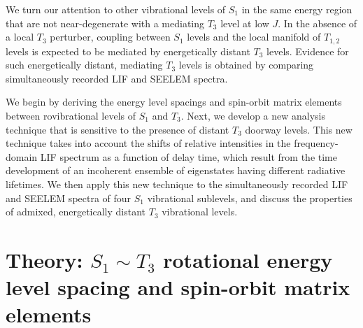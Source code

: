 \documentclass[12pt]{mitthesis}
\begin{document}
We turn our attention to other vibrational levels of $S_1$ in the same
energy region that are not near-degenerate with a mediating $T_3$
level at low $J$.  In the absence of a local $T_3$ perturber, coupling
between $S_1$ levels and the local manifold of $T_{1,2}$ levels is
expected to be mediated by energetically distant $T_3$ levels.
Evidence for such energetically distant, mediating $T_3$ levels is
obtained by comparing simultaneously recorded LIF and SEELEM spectra.

We begin by deriving the energy level spacings and spin-orbit matrix
elements between rovibrational levels of $S_1$ and $T_3$.  Next, we
develop a new analysis technique that is sensitive to the presence of
distant $T_3$ doorway levels.  This new technique takes into account
the shifts of relative intensities in the frequency-domain LIF
spectrum as a function of delay time, which result from the time
development of an incoherent ensemble of eigenstates having different
radiative lifetimes.  We then apply this new technique to the
simultaneously recorded LIF and SEELEM spectra of four $S_1$
vibrational sublevels, and discuss the properties of admixed,
energetically distant $T_3$ vibrational levels.

\section{Theory: $S_1 \sim T_3$ rotational energy level spacing and
  spin-orbit matrix elements}
\label{theory1}
\end{document}
